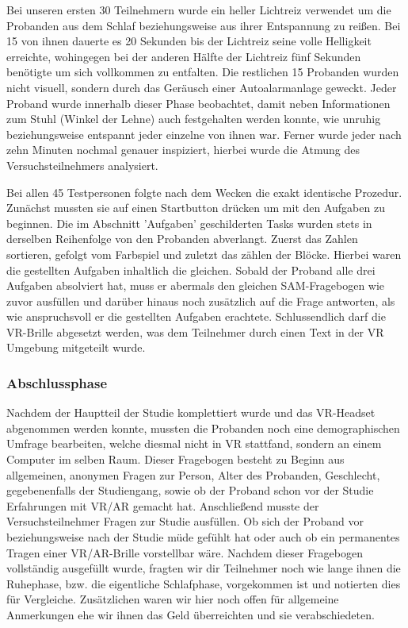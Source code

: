 Bei unseren ersten 30 Teilnehmern wurde ein heller Lichtreiz verwendet um die Probanden aus dem Schlaf beziehungsweise aus ihrer Entspannung zu reißen. Bei 15 von ihnen dauerte es 20 Sekunden bis der Lichtreiz seine volle Helligkeit erreichte, wohingegen bei der anderen Hälfte der Lichtreiz fünf Sekunden benötigte um sich vollkommen zu entfalten. Die restlichen 15 Probanden wurden nicht visuell, sondern durch das Geräusch einer Autoalarmanlage geweckt. Jeder Proband wurde innerhalb dieser Phase beobachtet, damit neben Informationen zum Stuhl (Winkel der Lehne) auch festgehalten werden konnte, wie unruhig beziehungsweise entspannt jeder einzelne von ihnen war. Ferner wurde jeder nach zehn Minuten nochmal genauer inspiziert, hierbei wurde die Atmung des Versuchsteilnehmers analysiert.

Bei allen 45 Testpersonen folgte nach dem Wecken die exakt identische Prozedur. Zunächst mussten sie auf einen Startbutton drücken um mit den Aufgaben zu beginnen. Die im Abschnitt 'Aufgaben' geschilderten Tasks wurden stets in derselben Reihenfolge von den Probanden abverlangt. Zuerst das Zahlen sortieren, gefolgt vom Farbspiel und zuletzt das zählen der Blöcke. Hierbei waren die gestellten Aufgaben inhaltlich die gleichen. %
Sobald der Proband alle drei Aufgaben absolviert hat, muss er abermals den gleichen SAM-Fragebogen wie zuvor ausfüllen und darüber hinaus noch zusätzlich auf die Frage antworten, als wie anspruchsvoll er die gestellten Aufgaben erachtete. Schlussendlich darf die VR-Brille abgesetzt werden, was dem Teilnehmer durch einen Text in der VR Umgebung mitgeteilt wurde.

\subsubsection{Abschlussphase}
Nachdem der Hauptteil der Studie komplettiert wurde und das VR-Headset abgenommen werden konnte, mussten die Probanden noch eine demographischen Umfrage bearbeiten, welche diesmal nicht in VR stattfand, sondern an einem Computer im selben Raum. 
Dieser Fragebogen besteht zu Beginn aus allgemeinen, anonymen Fragen zur Person, Alter des Probanden, Geschlecht, gegebenenfalls der Studiengang, sowie ob der Proband schon vor der Studie Erfahrungen mit VR/AR gemacht hat. 
Anschließend musste der Versuchsteilnehmer Fragen zur Studie ausfüllen. Ob sich der Proband vor beziehungsweise nach der Studie müde gefühlt hat oder auch ob ein permanentes Tragen einer VR/AR-Brille vorstellbar wäre.
Nachdem dieser Fragebogen vollständig ausgefüllt wurde, fragten wir dir Teilnehmer noch wie lange ihnen die Ruhephase, bzw. die eigentliche Schlafphase, vorgekommen ist und notierten dies für Vergleiche. Zusätzlichen waren wir hier noch offen für allgemeine Anmerkungen ehe wir ihnen das Geld überreichten und sie verabschiedeten.
